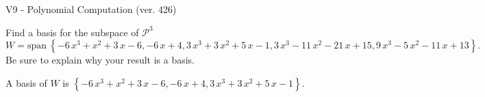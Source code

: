 \begin{exercise}
  \begin{exerciseTitle}V9 - Polynomial Computation (ver. 426)\end{exerciseTitle}
  \begin{exerciseStatement}
    Find a basis for the subspace of \(\mathcal{P}^3\) 
\[W=\mathrm{span}\ \left\{-6 \, x^{3} + x^{2} + 3 \, x - 6 , -6 \, x + 4 , 3 \, x^{3} + 3 \, x^{2} + 5 \, x - 1 , 3 \, x^{3} - 11 \, x^{2} - 21 \, x + 15 , 9 \, x^{3} - 5 \, x^{2} - 11 \, x + 13\right\}.\]
 Be sure to explain why your result is a basis.


  \end{exerciseStatement}
  \begin{exerciseAnswer}
   A basis of \(W\) is  \(\left\{-6 \, x^{3} + x^{2} + 3 \, x - 6 , -6 \, x + 4 , 3 \, x^{3} + 3 \, x^{2} + 5 \, x - 1\right\}\).
  


  \end{exerciseAnswer}
\end{exercise}